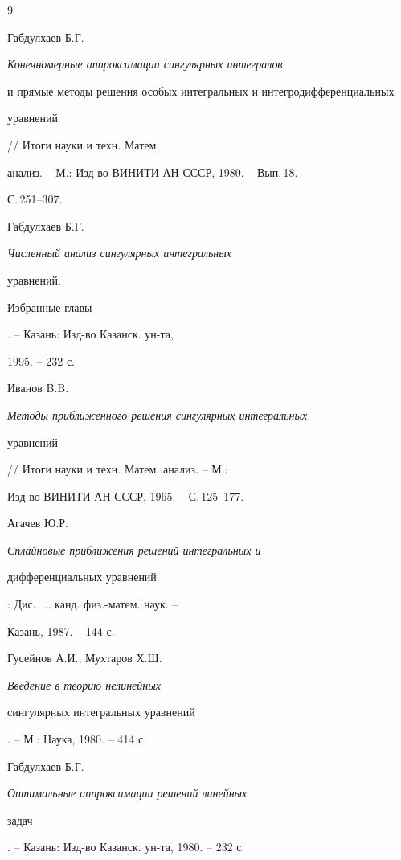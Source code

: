 \begin{thebibliography}{9}







Габдулхаев Б.Г. {\em Конечномерные аппроксимации сингулярных интегралов 


и прямые методы решения особых интегральных и интегродифференциальных 


уравнений} // Итоги науки и техн. Матем. 


анализ. -- М.: Изд-во ВИНИТИ АН СССР, 1980. -- Вып.\,18. --


С.\,251--307.




Габдулхаев Б.Г. {\em Численный анализ сингулярных интегральных 


уравнений. 


Избранные главы}. -- Казань: Изд-во Казанск. ун-та, 


1995. -- 232 с.




Иванов B.B. {\em Методы приближенного решения сингулярных интегральных 


уравнений} // Итоги науки и техн. Матем. анализ. -- М.: 


Изд-во ВИНИТИ АН СССР, 1965. -- С.\,125--177.




Агачев Ю.Р. {\em Сплайновые приближения решений интегральных и 


дифференциальных уравнений}: Дис.~$\dotsc$ канд. физ.-матем. наук. --


Казань, 1987. -- 144 с.




Гусейнов А.И., Мухтаров Х.Ш. {\em Введение в теорию нелинейных 


сингулярных интегральных уравнений}. -- М.: Наука, 1980. -- 414 с.




Габдулхаев Б.Г. {\em Оптимальные аппроксимации решений линейных 


задач}. -- Казань: Изд-во Казанск. ун-та, 1980. -- 232 с.





\end{thebibliography}





\vskip 2cm












\label{end}








